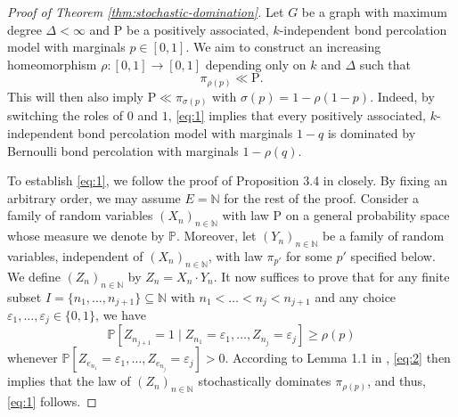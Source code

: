 \documentclass[11pt]{article}
\renewcommand{\P}{\mathrm{P}}
\theoremstyle{remark}
\begin{document}
\begin{proof}[Proof of Theorem \ref{thm:stochastic-domination}]
	Let $G$ be a graph with maximum degree $\Delta < \infty$ and $\P$ be a positively associated, $k$-independent bond percolation model with marginals $p \in [0,1]$. We aim to construct an increasing homeomorphism $\rho:[0,1]\to[0,1]$ depending only on $k$ and $\Delta$ such that 
	\begin{equation}\label{eq:1}
		\pi_{\rho(p)} \ll \P. 
	\end{equation}
	This will then also imply $\P \ll \pi_{\sigma(p)}$ with $\sigma(p)=1-\rho(1-p)$. Indeed, by switching the roles of $0$ and $1$, \eqref{eq:1} implies that every positively associated, $k$-independent bond percolation model with marginals $1-q$ is dominated by Bernoulli bond percolation with marginals $1-\rho(q)$. 
	
	To establish \eqref{eq:1}, we follow the proof of Proposition 3.4 in \cite{Liggett1997} closely. By fixing an arbitrary order, we may assume $E=\mathbb N$ for the rest of the proof. Consider a family of random variables $(X_n)_{n \in \mathbb N}$ with  law $\P$ on a general probability space whose measure we denote by $\mathbb P$. 
	Moreover, let $(Y_n)_{n\in \mathbb N}$ be a family of random variables, independent of $(X_n)_{n \in \mathbb N}$, with  law $\pi_{p'}$ for some $p'$ specified below. We define $(Z_n)_{n \in \mathbb N}$ by $Z_n = X_n \cdot Y_n$. 
	It now suffices to prove that for any finite subset $I = \{n_1,\ldots,n_{j+1}\} \subseteq \mathbb N$ with $n_1 < \ldots < n_j < n_{j+1}$ and any choice $\varepsilon_1,\ldots,\varepsilon_j \in \{0,1\}$, we have
	\begin{equation}\label{eq:2}
		\mathbb P[Z_{n_{j+1}} = 1 \mid Z_{n_1} = \varepsilon_1,\ldots,Z_{n_j}=\varepsilon_j] \ge \rho(p)
	\end{equation}
	whenever $\mathbb P[Z_{e_{n_1}} = \varepsilon_1,\ldots,Z_{e_{n_j}}=\varepsilon_j]>0$. According to Lemma 1.1 in \cite{Liggett1997}, \eqref{eq:2} then implies that the law of $(Z_n)_{n \in \mathbb N}$ stochastically dominates $\pi_{\rho(p)}$, and thus, \eqref{eq:1} follows. 
	

\end{proof}
\end{document}
